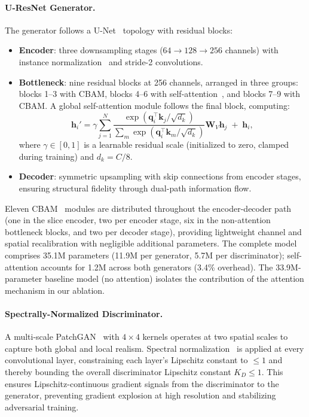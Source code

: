 \documentclass{article}
\begin{document}
\paragraph{U-ResNet Generator.}
The generator follows a U-Net~\cite{ronneberger2015unet} topology with residual blocks:
\begin{itemize}
  \item \textbf{Encoder}: three downsampling stages ($64 \to 128 \to 256$ channels) with
        instance normalization~\cite{ulyanov2016instance} and stride-2 convolutions.
  \item \textbf{Bottleneck}: nine residual blocks at 256 channels, arranged in three
        groups: blocks 1--3 with CBAM, blocks 4--6 with self-attention~\cite{zhang2019sagan},
        and blocks 7--9 with CBAM. A global self-attention module follows the final
        block, computing:
        \begin{equation}
          \mathbf{h}_i' = \gamma \sum_{j=1}^{N}
            \frac{\exp(\mathbf{q}_i^\top \mathbf{k}_j / \sqrt{d_k})}
                 {\sum_m \exp(\mathbf{q}_i^\top \mathbf{k}_m / \sqrt{d_k})}
            \mathbf{W}_V \mathbf{h}_j \;+\; \mathbf{h}_i,
          \label{eq:sa}
        \end{equation}
        where $\gamma \in [0,1]$ is a learnable residual scale (initialized to zero,
        clamped during training) and $d_k = C/8$.
  \item \textbf{Decoder}: symmetric upsampling with skip connections from encoder stages,
        ensuring structural fidelity through dual-path information flow.
\end{itemize}
Eleven CBAM~\cite{woo2018cbam} modules are distributed throughout the encoder-decoder
path (one in the slice encoder, two per encoder stage, six in the non-attention
bottleneck blocks, and two per decoder stage), providing lightweight channel and spatial
recalibration with negligible additional parameters. The complete model comprises 35.1M
parameters (11.9M per generator, 5.7M per discriminator); self-attention accounts for
1.2M across both generators (3.4\% overhead). The 33.9M-parameter baseline model (no
attention) isolates the contribution of the attention mechanism in our ablation.

\paragraph{Spectrally-Normalized Discriminator.}
A multi-scale PatchGAN~\cite{isola2017pix2pix} with $4\times4$ kernels operates at two
spatial scales to capture both global and local realism. Spectral normalization~\cite{miyato2018spectral}
is applied at every convolutional layer, constraining each layer's Lipschitz constant to
$\leq 1$ and thereby bounding the overall discriminator Lipschitz constant $K_D \leq 1$.
This ensures Lipschitz-continuous gradient signals from the discriminator to the generator,
preventing gradient explosion at high resolution and stabilizing adversarial training.
\end{document}
